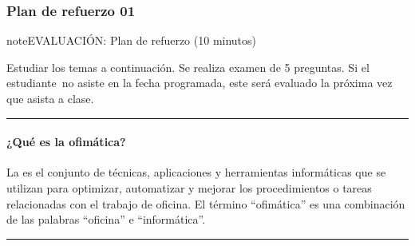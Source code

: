 \documentclass[letterpaper,10pt,spanish]{sphinxmanual}
\begin{document}
\subsubsection{Plan de refuerzo 01}
\label{\detokenize{cursos/ofimatica10/periodo01/R01:plan-de-refuerzo-01}}\label{\detokenize{cursos/ofimatica10/periodo01/R01::doc}}
\begin{sphinxadmonition}{note}{EVALUACIÓN: Plan de refuerzo (10 minutos)}

\sphinxAtStartPar
Estudiar los temas a continuación. Se realiza examen de 5 preguntas. Si el estudiante no asiste en la fecha programada, este será evaluado la próxima vez que asista a clase.
\end{sphinxadmonition}


\bigskip\hrule\bigskip



\paragraph{¿Qué es la ofimática?}
\label{\detokenize{cursos/ofimatica10/periodo01/R01:que-es-la-ofimatica}}
\sphinxAtStartPar
La  es el conjunto de técnicas, aplicaciones y herramientas informáticas que se utilizan para optimizar, automatizar y mejorar los procedimientos o tareas relacionadas con el trabajo de oficina. El término “ofimática” es una combinación de las palabras “oficina” e “informática”.


\bigskip\hrule\bigskip
\end{document}
